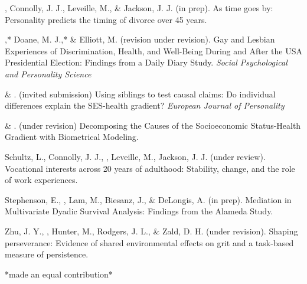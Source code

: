 
\item\meb, Connolly, J. J., Leveille, M., \& Jackson, J. J. (in prep). As time goes by: Personality predicts the timing of divorce over 45 years. %
\item\meb,* Doane, M. J.,* \& Elliott, M. (revision under revision). Gay and Lesbian Experiences of Discrimination, Health, and Well-Being During and After the USA Presidential Election: Findings from a Daily Diary Study. \textit{Social Psychological and Personality Science} %
\item \meb \& \joe. (invited submission) Using siblings to test causal claims: Do individual differences explain the SES-health gradient? \textit{European Journal of Personality}
\item \meb \& \joe.  (under revision) Decomposing the Causes of the Socioeconomic Status-Health Gradient with Biometrical Modeling. %
\item Schultz, L., Connolly, J. J., \meb, Leveille, M., Jackson, J. J. (under review). Vocational interests across 20 years of adulthood: Stability, change, and the role of work experiences.%
\item Stephenson, E., \meb, Lam, M., Biesanz, J., \& DeLongis, A. (in prep). Mediation in Multivariate Dyadic Survival Analysis: Findings from the Alameda Study. %
\item Zhu, J. Y., \meb, Hunter, M., Rodgers, J. L., \& Zald, D. H. (under revision). Shaping perseverance: Evidence of shared environmental effects on grit and a task-based measure of persistence. %
\vspace{-2mm}\begin{center}\footnotesize{*made an equal contribution*}\end{center} \vspace{-3mm}
\vspace{-2mm}\begin{center}\end{center} \vspace{-4mm}
